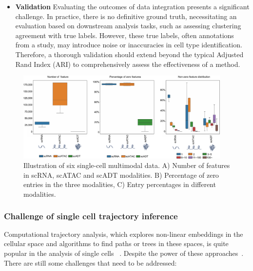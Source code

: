 \begin{itemize}
	\item \textbf{Validation} 
	Evaluating the outcomes of data integration presents a significant challenge. In practice, there is no definitive ground truth, necessitating an evaluation based on downstream analysis tasks, such as assessing clustering agreement with true labels. However, these true labels, often annotations from a study, may introduce noise or inaccuracies in cell type identification. Therefore, a thorough validation should extend beyond the typical Adjusted Rand Index (ARI) to comprehensively assess the effectiveness of a method.
\end{itemize}

\begin{figure}[!ht]
	\centering
	\includegraphics[width=0.95\textwidth]{feature_statistic/fig}
	\vspace{0.1cm}
	\caption[features characteristics comparison showing the challenge of multimodal integration.]{Illustration of six single-cell multimodal data. A) Number of features in scRNA, scATAC and scADT modalities. B) Percentage of zero entries in the three modalities, C) Entry percentages in different modalities.}
	\label{fig:modalities_differences}
\end{figure}


\subsubsection{Challenge of single cell trajectory inference}
\label{background:sec2:challenge_TI}

Computational trajectory analysis, which explores non-linear embeddings in the cellular space and algorithms to find paths or trees in these spaces, is quite popular in the analysis of single cells ~\citep{wolf2019paga,chen2019stream,street2018slingshot,Lynch2022}. Despite the power of these approaches~\cite{Saelens2019}. There are still some challenges that need to be addressed:

